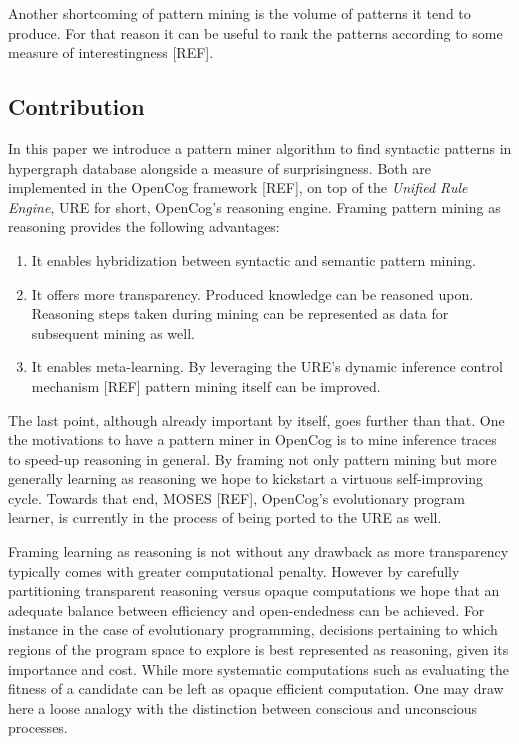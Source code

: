 \documentclass[runningheads]{llncs}
\begin{document}
Another shortcoming of pattern mining is the volume of patterns it
tend to produce. For that reason it can be useful to rank the patterns
according to some measure of interestingness [REF].

\subsection{Contribution}

In this paper we introduce a pattern miner algorithm to find syntactic
patterns in hypergraph database alongside a measure of
surprisingness. Both are implemented in the OpenCog framework [REF],
on top of the \emph{Unified Rule Engine}, URE for short, OpenCog's
reasoning engine. Framing pattern mining as reasoning provides the
following advantages:
\begin{enumerate}
\item It enables hybridization between syntactic and semantic pattern
  mining.
\item It offers more transparency. Produced knowledge can be reasoned
  upon. Reasoning steps taken during mining can be represented as data
  for subsequent mining as well.
\item It enables meta-learning. By leveraging the URE's dynamic
  inference control mechanism [REF] pattern mining itself can be
  improved.
\end{enumerate}
The last point, although already important by itself, goes further
than that. One the motivations to have a pattern miner in OpenCog is
to mine inference traces to speed-up reasoning in general. By framing
not only pattern mining but more generally learning as reasoning we
hope to kickstart a virtuous self-improving cycle. Towards that end,
MOSES [REF], OpenCog's evolutionary program learner, is currently in
the process of being ported to the URE as well.

Framing learning as reasoning is not without any drawback as more
transparency typically comes with greater computational
penalty. However by carefully partitioning transparent reasoning
versus opaque computations we hope that an adequate balance between
efficiency and open-endedness can be achieved. For instance in the
case of evolutionary programming, decisions pertaining to which
regions of the program space to explore is best represented as
reasoning, given its importance and cost. While more systematic
computations such as evaluating the fitness of a candidate can be left
as opaque efficient computation. One may draw here a loose analogy
with the distinction between conscious and unconscious processes.
\end{document}
